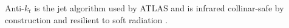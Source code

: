 Anti-$k_t$ is the jet algorithm used by ATLAS and is infrared collinar-safe by construction and resilient to soft radiation \cite{antikt}.

